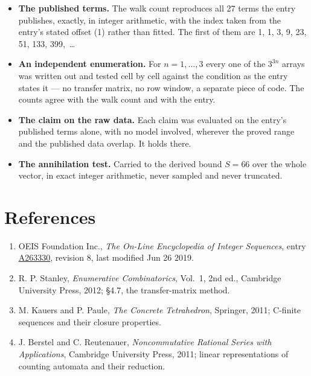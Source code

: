 \documentclass[11pt]{article}
\theoremstyle{definition}
\begin{document}
\begin{itemize}

\item {\bfseries The published terms.} The walk count reproduces all 27 terms the entry publishes, exactly, in integer arithmetic, with the index taken from the entry's stated offset (1) rather than fitted. The first of them are 1, 1, 3, 9, 23, 51, 133, 399,~\dots

\item {\bfseries An independent enumeration.} For $n = 1,\dots,3$ every one of the $3^{3n}$ arrays was written out and tested cell by cell against the condition as the entry states it --- no transfer matrix, no row window, a separate piece of code. The counts agree with the walk count and with the entry.

\item {\bfseries The claim on the raw data.} Each claim was evaluated on the entry's published terms alone, with no model involved, wherever the proved range and the published data overlap. It holds there.

\item {\bfseries The annihilation test.} Carried to the derived bound $S = 66$ over the whole vector, in exact integer arithmetic, never sampled and never truncated.

\end{itemize}

\section{References}

\begin{enumerate}

\item OEIS Foundation Inc., \emph{The On-Line Encyclopedia of Integer Sequences}, entry \href{https://oeis.org/A263330}{A263330}, revision 8, last modified Jun 26 2019.

\item R. P. Stanley, \emph{Enumerative Combinatorics}, Vol.~1, 2nd ed., Cambridge University Press, 2012; \S4.7, the transfer-matrix method.

\item M. Kauers and P. Paule, \emph{The Concrete Tetrahedron}, Springer, 2011; C-finite sequences and their closure properties.

\item J. Berstel and C. Reutenauer, \emph{Noncommutative Rational Series with Applications}, Cambridge University Press, 2011; linear representations of counting automata and their reduction.

\end{enumerate}
\end{document}
